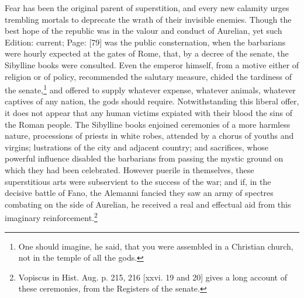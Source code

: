 Fear has been the original parent of superstition, and every new calamity urges trembling mortals to deprecate the wrath of their invisible enemies. Though the best hope of the republic was in the valour and conduct of Aurelian, yet such Edition: current; Page: [79] was the public consternation, when the barbarians were hourly expected at the gates of Rome, that, by a decree of the senate, the Sibylline books were consulted. Even the emperor himself, from a motive either of religion or of policy, recommended the salutary measure, chided the tardiness of the senate,\footnote{One should imagine, he said, that you were assembled in a Christian church, not in the temple of all the gods.} and offered to supply whatever expense, whatever animals, whatever captives of any nation, the gods should require. Notwithstanding this liberal offer, it does not appear that any human victims expiated with their blood the sins of the Roman people. The Sibylline books enjoined ceremonies of a more harmless nature, processions of priests in white robes, attended by a chorus of youths and virgins; lustrations of the city and adjacent country; and sacrifices, whose powerful influence disabled the barbarians from passing the mystic ground on which they had been celebrated. However puerile in themselves, these superstitious arts were subservient to the success of the war; and if, in the decisive battle of Fano, the Alemanni fancied they saw an army of spectres combating on the side of Aurelian, he received a real and effectual aid from this imaginary reinforcement.\footnote{Vopiscus in Hist. Aug. p. 215, 216 [xxvi. 19 and 20] gives a long account of these ceremonies, from the Registers of the senate.}

